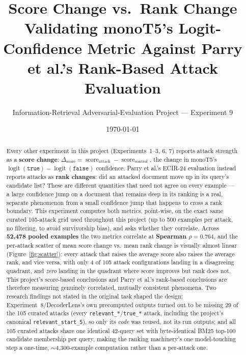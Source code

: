 \documentclass[11pt]{article}
\title{\textbf{Score Change vs.\ Rank Change} \\[2pt]
\large Validating monoT5's Logit-Confidence Metric Against
Parry et al.'s Rank-Based Attack Evaluation}
\author{Information-Retrieval Adversarial-Evaluation Project --- Experiment 9}
\date{\today}
\newcommand{\score}{\operatorname{score}}
\begin{document}
\maketitle

\begin{abstract}
Every other experiment in this project (Experiments~1--3, 6, 7) reports
attack strength as a \textbf{score change}:
$\Delta_{\score} = \score_{\text{attack}} - \score_{\text{control}}$, the
change in monoT5's $\operatorname{logit}(\texttt{true}){-}\operatorname{logit}(\texttt{false})$
confidence. Parry et al.'s ECIR-24 evaluation instead reports attacks as
\textbf{rank changes}: did an attacked document move up in its query's
candidate list? These are different quantities that need not agree on
every example --- a large confidence jump on a document that remains deep
in its ranking is a real, separate phenomenon from a small confidence jump
that happens to cross a rank boundary. This experiment computes both
metrics, point-wise, on the exact same curated 105-attack grid used
throughout this project (up to 500 examples per attack, no filtering, to
avoid survivorship bias), and asks whether they correlate. Across
\textbf{52{,}478 pooled examples} the two metrics correlate at
\textbf{Spearman $\rho = 0.764$}, and the per-attack scatter of mean score
change vs.\ mean rank change is visually almost linear
(Figure~\ref{fig:scatter}): every attack that raises the average score also
raises the average rank, and vice versa, with only 4 of 105 attack
configurations landing in a disagreeing quadrant, and \emph{zero} landing
in the quadrant where score improves but rank does not. This project's
score-based conclusions and Parry et al.'s rank-based conclusions are
therefore measuring genuinely correlated, mutually consistent phenomena.
Two research findings not stated in the original task shaped the design:
Experiment~8/DecoderLens's own precomputed outputs turned out to be missing
29 of the 105 curated attacks (every \texttt{relevant\_*}/\texttt{true\_*}
attack, including the project's canonical \texttt{relevant\_start\_5}), so
only its \emph{code} was reused, not its run outputs; and all 105 curated
attacks share one identical 42-query set with byte-identical BM25 top-100
candidate membership per query, making the ranking machinery's one
model-touching step a one-time, $\sim$4{,}300-example computation rather
than a per-attack one.
\end{abstract}

\tableofcontents
\newpage

\end{document}
